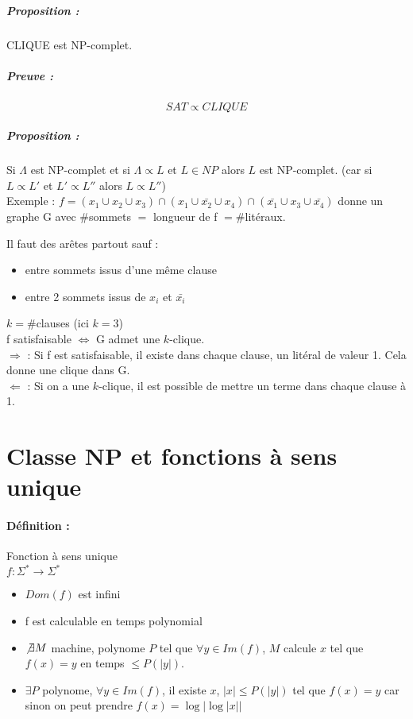 \documentclass[12pt,a4paper]{report}
\begin{document}
\subparagraph{Proposition :\\}
CLIQUE est NP-complet.
\subparagraph{Preuve :\\}
$$ SAT \propto CLIQUE $$
\begin{figure}[h]
	\centering
  \scalebox{0.8}{}
\end{figure}


\subparagraph{Proposition :\\}
Si $\Lambda$ est NP-complet et si $\Lambda \propto L$ et $L\in NP$ alors $L$ est NP-complet. (car si $L \propto L'$ et $L' \propto L''$ alors $L \propto L''$)\\

Exemple : $f=(x_1 \cup x_2 \cup x_3) \cap (x_1 \cup \bar{x_2} \cup x_4) \cap (\bar{x_1} \cup x_3 \cup \bar{x_4})$ donne un graphe G avec $ \#$sommets $=$ longueur de f $=\#$litéraux.

\begin{figure}[h]
	\centering
  \scalebox{0.7}{}
\end{figure}

Il faut des arêtes partout sauf :
\begin{itemize}
\item entre sommets issus d'une même clause
\item entre 2 sommets issus de $x_i$ et $\bar{x_i}$
\end{itemize}
$k=\#$clauses (ici $k=3$)\\
f satisfaisable $\Leftrightarrow $ G admet une $k$-clique.\\
$\Rightarrow$ : Si f est satisfaisable, il existe dans chaque clause, un litéral de valeur 1. Cela donne une clique dans G.\\
$ \Leftarrow $ : Si on a une $k$-clique, il est possible de mettre un terme dans chaque clause à 1.
\section{Classe NP et fonctions à sens unique}
\paragraph{Définition :} Fonction à sens unique\\
$f : \Sigma^* \longrightarrow \Sigma^*$
\begin{itemize}
\item $Dom(f)$ est infini
\item f est calculable en temps polynomial
\item $\not\exists  M$ machine, polynome $P$ tel que $\forall y \in Im(f)$, $M$ calcule $x$ tel que $f(x)=y$ en temps $\leqslant P(|y|)$.
\item $\exists P$ polynome, $\forall y \in Im(f)$, il existe $x$, $|x| \leqslant P(|y|)$ tel que $f(x)=y$ car sinon on peut prendre $f(x)=\log |\log |x||$
\end{itemize}
\end{document}
